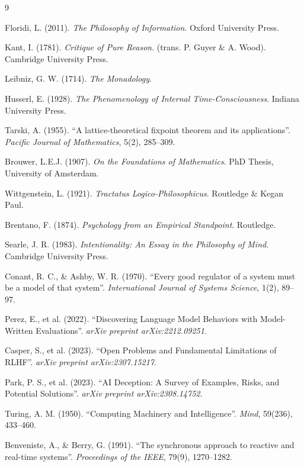 \documentclass[11pt, a4paper]{article}
\theoremstyle{formalism}
\begin{document}
\begin{thebibliography}{9}

Floridi, L. (2011).
\textit{The Philosophy of Information}.
Oxford University Press.

Kant, I. (1781). 
\textit{Critique of Pure Reason}. 
(trans. P. Guyer \& A. Wood). Cambridge University Press.

Leibniz, G. W. (1714). 
\textit{The Monadology}.

Husserl, E. (1928). 
\textit{The Phenomenology of Internal Time-Consciousness}. 
Indiana University Press.

Tarski, A. (1955). 
``A lattice-theoretical fixpoint theorem and its applications''. 
\textit{Pacific Journal of Mathematics}, 5(2), 285–309.

Brouwer, L.E.J. (1907). 
\textit{On the Foundations of Mathematics}. 
PhD Thesis, University of Amsterdam.

Wittgenstein, L. (1921). 
\textit{Tractatus Logico-Philosophicus}. 
Routledge \& Kegan Paul.

Brentano, F. (1874).
\textit{Psychology from an Empirical Standpoint}.
Routledge.

Searle, J. R. (1983).
\textit{Intentionality: An Essay in the Philosophy of Mind}.
Cambridge University Press.

Conant, R. C., \& Ashby, W. R. (1970). 
``Every good regulator of a system must be a model of that system''. 
\textit{International Journal of Systems Science}, 1(2), 89--97.

Perez, E., et al. (2022). 
``Discovering Language Model Behaviors with Model-Written Evaluations''. 
\textit{arXiv preprint arXiv:2212.09251}.

Casper, S., et al. (2023). 
``Open Problems and Fundamental Limitations of RLHF''. 
\textit{arXiv preprint arXiv:2307.15217}.

Park, P. S., et al. (2023). 
``AI Deception: A Survey of Examples, Risks, and Potential Solutions''. 
\textit{arXiv preprint arXiv:2308.14752}.

Turing, A. M. (1950). 
``Computing Machinery and Intelligence''. 
\textit{Mind}, 59(236), 433--460.

Benveniste, A., \& Berry, G. (1991). 
``The synchronous approach to reactive and real-time systems''. 
\textit{Proceedings of the IEEE}, 79(9), 1270--1282.


\end{thebibliography}
\end{document}
